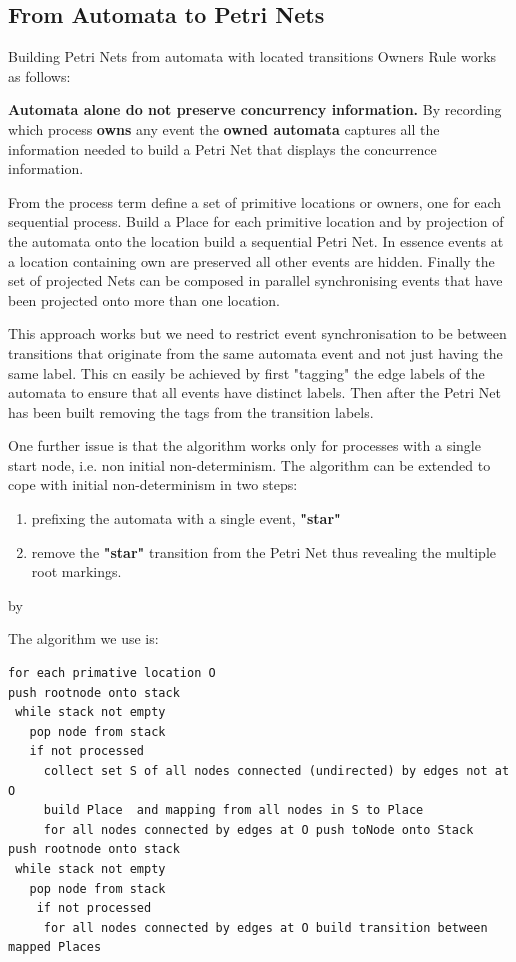 \documentclass[]{article}
\begin{document}
\subsection{From Automata to Petri Nets}
Building Petri Nets from automata with located transitions {\sf Owners Rule} works as follows:




{\bf Automata alone do not preserve concurrency information.}  By recording which process {\bf owns} any event the {\bf owned automata} captures all the information needed to build a Petri Net that displays the concurrence information. 


 From the process term define a set of primitive locations or owners, one for each sequential process.  Build a Place for each primitive location and by projection of  the automata onto the location build a sequential Petri Net. In essence events at a location containing {\sf own} are preserved all other events are hidden. Finally the set of projected Nets can be composed in parallel synchronising  events that have been projected onto more than one location. 
 
 This approach works but we need to restrict event synchronisation to be between transitions that originate from the same automata event and not just having the same label.  This cn easily be achieved by first "tagging" the edge labels of the automata to ensure that all events have distinct labels. Then after the Petri Net has been built removing the tags from the transition labels.
 
 One further issue is that the algorithm works only for processes with a single start node, i.e. non initial non-determinism. The algorithm can be extended to cope with initial non-determinism  in two steps:
 
 \begin{enumerate}
 \item prefixing the automata with a single event, {\bf "star"}
 \item remove the  {\bf "star"} transition from the Petri Net thus revealing the multiple root markings.
 \end{enumerate}by 
 
 The algorithm we use is:
 \begin{verbatim}
for each primative location O  
push rootnode onto stack
 while stack not empty
   pop node from stack 
   if not processed  
     collect set S of all nodes connected (undirected) by edges not at O
     build Place  and mapping from all nodes in S to Place
     for all nodes connected by edges at O push toNode onto Stack
push rootnode onto stack
 while stack not empty
   pop node from stack 
    if not processed  
     for all nodes connected by edges at O build transition between mapped Places        
 \end{verbatim}
 
\end{document}
